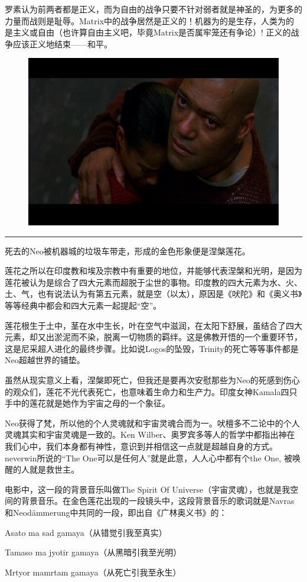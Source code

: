\documentclass[UTF8]{ctexart}
\newcommand{\myparsep}{\noindent \rule[0.5ex]{\linewidth}{1pt}}
\newenvironment{myquote}{\color{green} \setlength{\leftskip}{6em} \setlength{\rightskip}{4em} \setlength{\parindent}{-2em}}{\par}
\begin{document}
罗素认为前两者都是正义，而为自由的战争只要不针对弱者就是神圣的，为更多的力量而战则是耻辱。Matrix中的战争居然是正义的！机器为的是生存，人类为的是主义或自由（也许算自由主义吧，毕竟Matrix是否属牢笼还有争论）! 正义的战争应该正义地结束——和平。

\begin{figure}[htb]
\centering
\includegraphics[width=0.5\linewidth]{fig/948b380177e8230a7aec2c5a.jpg}
\end{figure}

\myparsep

死去的Neo被机器城的垃圾车带走，形成的金色形象便是涅槃莲花。

莲花之所以在印度教和埃及宗教中有重要的地位，并能够代表涅槃和光明，是因为莲花被认为是综合了四大元素而超脱于尘世的事物。印度教的四大元素为水、火、土、气，也有说法认为有第五元素，就是空（以太），原因是《吠陀》和《奥义书》等等经典中都会和四大元素一起提起“空”。

莲花根生于土中，茎在水中生长，叶在空气中滋润，在太阳下舒展，虽结合了四大元素，却又出淤泥而不染，脱离一切物质的羁绊。这是佛教开悟的一个重要环节，这是尼采超人进化的最终步骤。比如说Logos的坠毁，Trinity的死亡等等事件都是Neo超越世界的铺垫。

虽然从现实意义上看，涅槃即死亡，但我还是要再次安慰那些为Neo的死感到伤心的观众们，莲花不光代表死亡，也意味着生命力和生产力。印度女神Kamala四只手中的莲花就是她作为宇宙之母的一个象征。

Neo获得了梵，所以他的个人灵魂就和宇宙灵魂合而为一。吠檀多不二论中的个人灵魂其实和宇宙灵魂是一致的。Ken Wilber、奥罗宾多等人的哲学中都指出神在我们心中，我们本身都有神性，意识到并相信这一点就是超越自身的方式。neverwin所说的“The One可以是任何人”就是此意，人人心中都有个the One, 被唤醒的人就是救世主。

电影中，这一段的背景音乐叫做The Spirit Of Universe（宇宙灵魂），也就是我空间的背景音乐。在金色莲花出现的一段镜头中，这段背景音乐的歌词就是Navras和Neodämmerung中共同的一段，即出自《广林奥义书》的：

\begin{myquote}
Asato ma sad gamaya（从错觉引我至真实）

Tamaso ma jyotir gamaya（从黑暗引我至光明）

Mrtyor mamrtam gamaya（从死亡引我至永生）
\end{myquote}
\end{document}
